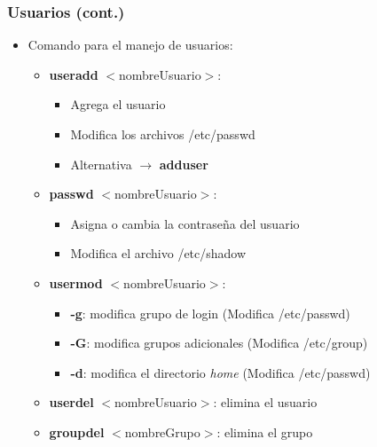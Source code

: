 \begin{frame}
  \frametitle{Usuarios (cont.)}
  \begin{itemize}
	  \item Comando para el manejo de usuarios:
	  \begin{itemize}
	  	\item \textbf{useradd} $<$nombreUsuario$>$:
	  	\begin{itemize}
	  		\item Agrega el usuario
	  		\item Modifica los archivos /etc/passwd
	  		\item Alternativa $\rightarrow$ \textbf{adduser}
	  	\end{itemize}
	  	\item \textbf{passwd} $<$nombreUsuario$>$:
	  	\begin{itemize}
	  		\item Asigna o cambia la contraseña del usuario
	  		\item Modifica el archivo /etc/shadow
	  	\end{itemize}
	  	\item \textbf{usermod} $<$nombreUsuario$>$:
	  	\begin{itemize}
	  		\item \textbf{-g}: modifica grupo de login (Modifica /etc/passwd)
	  		\item \textbf{-G}: modifica grupos adicionales (Modifica /etc/group)
	  		\item \textbf{-d}: modifica el directorio \emph{home} (Modifica /etc/passwd)
	  	\end{itemize}
	  	\item \textbf{userdel} $<$nombreUsuario$>$: elimina el usuario
	  	\item \textbf{groupdel} $<$nombreGrupo$>$: elimina el grupo
	  \end{itemize}
  \end{itemize}
\end{frame}

